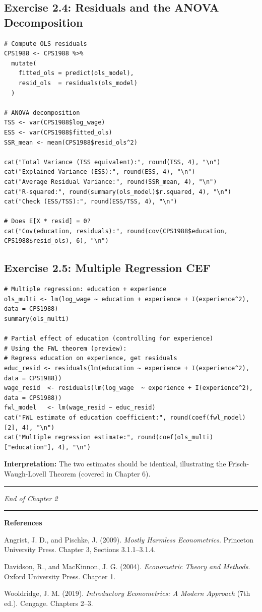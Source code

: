 \subsection{Exercise 2.4: Residuals and the ANOVA Decomposition}

\begin{lstlisting}
# Compute OLS residuals
CPS1988 <- CPS1988 %>%
  mutate(
    fitted_ols = predict(ols_model),
    resid_ols  = residuals(ols_model)
  )

# ANOVA decomposition
TSS <- var(CPS1988$log_wage)
ESS <- var(CPS1988$fitted_ols)
SSR_mean <- mean(CPS1988$resid_ols^2)

cat("Total Variance (TSS equivalent):", round(TSS, 4), "\n")
cat("Explained Variance (ESS):", round(ESS, 4), "\n")
cat("Average Residual Variance:", round(SSR_mean, 4), "\n")
cat("R-squared:", round(summary(ols_model)$r.squared, 4), "\n")
cat("Check (ESS/TSS):", round(ESS/TSS, 4), "\n")

# Does E[X * resid] = 0?
cat("Cov(education, residuals):", round(cov(CPS1988$education, CPS1988$resid_ols), 6), "\n")
\end{lstlisting}

\subsection{Exercise 2.5: Multiple Regression CEF}

\begin{lstlisting}
# Multiple regression: education + experience
ols_multi <- lm(log_wage ~ education + experience + I(experience^2), data = CPS1988)
summary(ols_multi)

# Partial effect of education (controlling for experience)
# Using the FWL theorem (preview):
# Regress education on experience, get residuals
educ_resid <- residuals(lm(education ~ experience + I(experience^2), data = CPS1988))
wage_resid  <- residuals(lm(log_wage  ~ experience + I(experience^2), data = CPS1988))
fwl_model   <- lm(wage_resid ~ educ_resid)
cat("FWL estimate of education coefficient:", round(coef(fwl_model)[2], 4), "\n")
cat("Multiple regression estimate:", round(coef(ols_multi)["education"], 4), "\n")
\end{lstlisting}

\textbf{Interpretation:} The two estimates should be identical, illustrating the Frisch-Waugh-Lovell Theorem (covered in Chapter 6).

\medskip\hrule\medskip

\textit{End of Chapter 2}

\medskip\hrule\medskip

\textbf{References}

Angrist, J. D., and Pischke, J. (2009). \textit{Mostly Harmless Econometrics}. Princeton University Press. Chapter 3, Sections 3.1.1--3.1.4.

Davidson, R., and MacKinnon, J. G. (2004). \textit{Econometric Theory and Methods}. Oxford University Press. Chapter 1.

Wooldridge, J. M. (2019). \textit{Introductory Econometrics: A Modern Approach} (7th ed.). Cengage. Chapters 2--3.
